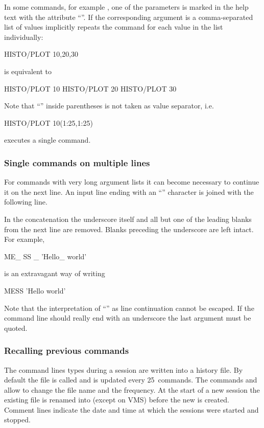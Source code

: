 In some commands, for example , one of the parameters
is marked in the help text with the attribute ``''.
If the corresponding argument is a comma-separated list of values
\KUIP{} implicitly repeats the command for each value in the list
individually: 
\begin{XMP}
HISTO/PLOT 10,20,30
\end{XMP}
is equivalent to
\begin{XMP}
HISTO/PLOT 10
HISTO/PLOT 20
HISTO/PLOT 30
\end{XMP}
Note that ``\Lit{,}'' inside parentheses is not taken as value
separator, i.e.\
\begin{XMP}
HISTO/PLOT 10(1:25,1:25)
\end{XMP}
executes a single command.


\subsubsection{Single commands on multiple lines}

For commands with very long argument lists it can become necessary to
continue it on the next line.
An input line ending with an ``\Lit{_}'' character is joined with
the following line.

In the concatenation the underscore itself and all but one of the
leading blanks from the next line are removed.
Blanks preceding the underscore are left intact.
For example,
\begin{XMP}
ME_
SS _
'Hello_
       world'
\end{XMP}
is an extravagant way of writing
\begin{XMP}
MESS 'Hello world'
\end{XMP}
Note that the interpretation of ``\Lit{_}'' as line continuation
cannot be escaped.
If the command line should really end with an underscore the last
argument must be quoted.

%
%
\subsubsection{Recalling previous commands}

The command lines types during a session are written into a history file.
By default the file is called \Lit{last.kumac} and is updated every
25~commands.
The commands  and  allow to change the file
name and the frequency.
At the start of a new session the existing file is renamed into
 (except on VMS) before the new  is created.
Comment lines indicate the date and time at which the sessions were
started and stopped. 

